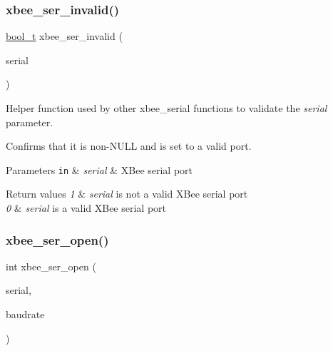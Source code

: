 \subsubsection{\texorpdfstring{xbee\+\_\+ser\+\_\+invalid()}{xbee\_ser\_invalid()}}
{\footnotesize\ttfamily \hyperlink{group__hal__dos_ga04dd5074964518403bf944f2b240a5f8}{bool\+\_\+t} xbee\+\_\+ser\+\_\+invalid (\begin{DoxyParamCaption}\item[{\hyperlink{structxbee__serial__t}{xbee\+\_\+serial\+\_\+t} $\ast$}]{serial }\end{DoxyParamCaption})}



Helper function used by other xbee\+\_\+serial functions to validate the {\itshape serial} parameter. 

Confirms that it is non-\/{\ttfamily N\+U\+LL} and is set to a valid port.


\begin{DoxyParams}[1]{Parameters}
\mbox{\tt in}  & {\em serial} & X\+Bee serial port\\
\hline
\end{DoxyParams}

\begin{DoxyRetVals}{Return values}
{\em 1} & {\itshape serial} is not a valid X\+Bee serial port \\
\hline
{\em 0} & {\itshape serial} is a valid X\+Bee serial port \\
\hline
\end{DoxyRetVals}
\mbox{\label{group__hal__kl25_gaa615a221dd69c17ee2989c281f2bf04a}} 
\subsubsection{\texorpdfstring{xbee\+\_\+ser\+\_\+open()}{xbee\_ser\_open()}}
{\footnotesize\ttfamily int xbee\+\_\+ser\+\_\+open (\begin{DoxyParamCaption}\item[{\hyperlink{structxbee__serial__t}{xbee\+\_\+serial\+\_\+t} $\ast$}]{serial,  }\item[{\hyperlink{group__hal__dos_ga09a1e304d66d35dd47daffee9731edaa}{uint32\+\_\+t}}]{baudrate }\end{DoxyParamCaption})}



